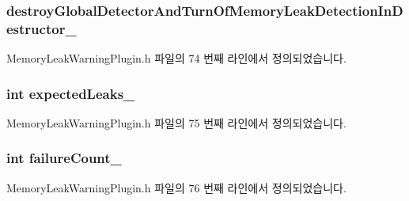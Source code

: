 \subsubsection[{\texorpdfstring{destroy\+Global\+Detector\+And\+Turn\+Of\+Memory\+Leak\+Detection\+In\+Destructor\+\_\+}{destroyGlobalDetectorAndTurnOfMemoryLeakDetectionInDestructor_}}]{ destroy\+Global\+Detector\+And\+Turn\+Of\+Memory\+Leak\+Detection\+In\+Destructor\+\_\+\hspace{0.3cm}{\ttfamily [private]}}\hypertarget{class_memory_leak_warning_plugin_a790e256fbe7d8f5660bc2ff7fcea4fb2}{}\label{class_memory_leak_warning_plugin_a790e256fbe7d8f5660bc2ff7fcea4fb2}


Memory\+Leak\+Warning\+Plugin.\+h 파일의 74 번째 라인에서 정의되었습니다.

\subsubsection[{\texorpdfstring{expected\+Leaks\+\_\+}{expectedLeaks_}}]{\setlength{\rightskip}{0pt plus 5cm}int expected\+Leaks\+\_\+\hspace{0.3cm}{\ttfamily [private]}}\hypertarget{class_memory_leak_warning_plugin_a7d18a67c3be157258b86787ef367d540}{}\label{class_memory_leak_warning_plugin_a7d18a67c3be157258b86787ef367d540}


Memory\+Leak\+Warning\+Plugin.\+h 파일의 75 번째 라인에서 정의되었습니다.

\subsubsection[{\texorpdfstring{failure\+Count\+\_\+}{failureCount_}}]{\setlength{\rightskip}{0pt plus 5cm}int failure\+Count\+\_\+\hspace{0.3cm}{\ttfamily [private]}}\hypertarget{class_memory_leak_warning_plugin_a006a6550e4e3d4de173c35b50c1c90b0}{}\label{class_memory_leak_warning_plugin_a006a6550e4e3d4de173c35b50c1c90b0}


Memory\+Leak\+Warning\+Plugin.\+h 파일의 76 번째 라인에서 정의되었습니다.

